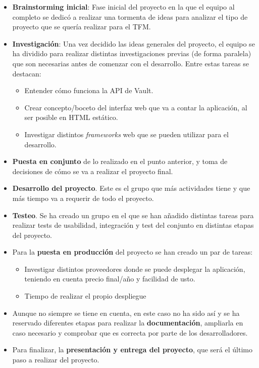 \documentclass{\ClassPath/viu-tfm-template}
\begin{document}
\begin{itemize}
    \item \textbf{Brainstorming inicial}: Fase inicial del proyecto en la que el equipo al completo se dedicó a realizar una tormenta de ideas para analizar el tipo de proyecto que se quería realizar para el TFM.

    \item \textbf{Investigación}: Una vez decidido las ideas generales del proyecto, el equipo se ha dividido para realizar distintas investigaciones previas (de forma paralela) que son necesarias antes de comenzar con el desarrollo. Entre estas tareas se destacan:
    \begin{itemize}
        \item Entender cómo funciona la API de Vault.
        \item Crear concepto/boceto del interfaz web que va a contar la aplicación, al ser posible en HTML estático.
        \item Investigar distintos \textit{frameworks} web que se pueden utilizar para el desarrollo.
    \end{itemize}

    \item \textbf{Puesta en conjunto} de lo realizado en el punto anterior, y toma de decisiones de cómo se va a realizar el proyecto final.

    \item \textbf{Desarrollo del proyecto}. Este es el grupo que más actividades tiene y que más tiempo va a requerir de todo el proyecto.

    \item \textbf{Testeo}. Se ha creado un grupo en el que se han añadido distintas tareas para realizar tests de usabilidad, integración y test del conjunto en distintas etapas del proyecto.

    \item Para la \textbf{puesta en producción} del proyecto se han creado un par de tareas:
    \begin{itemize}
        \item Investigar distintos proveedores donde se puede desplegar la aplicación, teniendo en cuenta precio final/año y facilidad de usto.
        \item Tiempo de realizar el propio despliegue
    \end{itemize}

    \item Aunque no siempre se tiene en cuenta, en este caso no ha sido así y se ha reservado diferentes etapas para realizar la \textbf{documentación}, ampliarla en caso necesario y comprobar que es correcta por parte de los desarrolladores.

    \item Para finalizar, la \textbf{presentación y entrega del proyecto}, que será el último paso a realizar del proyecto.
\end{itemize}
\end{document}

